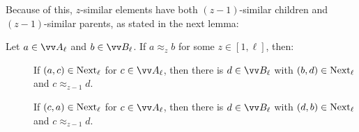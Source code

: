 Because of this, $z$-similar elements have both $(z-1)$-similar children and $(z-1)$-similar parents, as stated in the next lemma:
\begin{lemma}\label{lem:approx-next}
  Let $a \in \unraveldom{A}_{\ell}$ and $b \in \unraveldom{B}_{\ell}$. If $a \approx_{z} b$ for some $z \in [1,\ell]$, then:
  \begin{description}
    \item[] If $(a, c) \in \mathrm{Next}_{\ell}$ for $c \in \unraveldom{A}_{\ell}$, then there is $d \in \unraveldom{B}_{\ell}$ with $(b, d) \in \mathrm{Next}_{\ell}$ and $c \approx_{z-1} d$.
    \item[] If $(c, a) \in \mathrm{Next}_{\ell}$ for $c \in \unraveldom{A}_{\ell}$, then there is $d \in \unraveldom{B}_{\ell}$ with $(d, b) \in \mathrm{Next}_{\ell}$ and $c \approx_{z-1} d$.
  \end{description}
\end{lemma}
